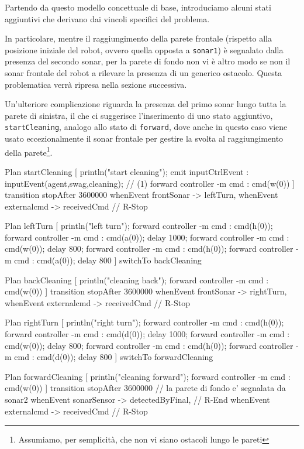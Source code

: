\documentclass{../llncs}
\newcommand{\code}[1]{{\color{blue}\small{\texttt{#1}}}}
\begin{document}
Partendo da questo modello concettuale di base, introduciamo alcuni stati aggiuntivi che derivano dai vincoli specifici del problema.

In particolare, mentre il raggiungimento della parete frontale (rispetto alla posizione iniziale del robot, ovvero quella opposta a \code{sonar1}) è segnalato dalla presenza del secondo sonar, per la parete di fondo non vi è altro modo se non il sonar frontale del robot a rilevare la presenza di un generico ostacolo. Questa problematica verrà ripresa nella sezione successiva.

Un'ulteriore complicazione riguarda la presenza del primo sonar lungo tutta la parete di sinistra, il che ci suggerisce l'inserimento di uno stato aggiuntivo, \texttt{startCleaning}, analogo allo stato di \texttt{forward}, dove anche in questo caso viene usato eccezionalmente il sonar frontale per gestire la svolta al raggiungimento della parete\footnote{Assumiamo, per semplicità, che non vi siano ostacoli lungo le pareti}.\\

\begin{qacode}[caption={SoftwareAgent, pt5}]
Plan startCleaning [
	println("start cleaning");
	emit inputCtrlEvent : inputEvent(agent,swag,cleaning); // (1)
	forward controller -m cmd : cmd(w(0))
]
transition stopAfter 3600000
	whenEvent frontSonar -> leftTurn,
	whenEvent externalcmd -> receivedCmd // R-Stop
	
Plan leftTurn [
	println("left turn");	
	forward controller -m cmd : cmd(h(0));
	forward controller -m cmd : cmd(a(0));
	delay 1000;
	forward controller -m cmd : cmd(w(0));
	delay 800;
	forward controller -m cmd : cmd(h(0));
	forward controller -m cmd : cmd(a(0));
	delay 800
]
switchTo backCleaning

Plan backCleaning [
	println("cleaning back");
	forward controller -m cmd : cmd(w(0))
]
transition stopAfter 3600000
	whenEvent frontSonar -> rightTurn,
	whenEvent externalcmd -> receivedCmd // R-Stop
	
Plan rightTurn [
	println("right turn");
	forward controller -m cmd : cmd(h(0));
	forward controller -m cmd : cmd(d(0));
	delay 1000;
	forward controller -m cmd : cmd(w(0));
	delay 800;
	forward controller -m cmd : cmd(h(0));
	forward controller -m cmd : cmd(d(0));
	delay 800
]
switchTo forwardCleaning

Plan forwardCleaning [
	println("cleaning forward");
	forward controller -m cmd : cmd(w(0))
]
transition stopAfter 3600000
	// la parete di fondo e' segnalata da sonar2
	whenEvent sonarSensor -> detectedByFinal, // R-End
	whenEvent externalcmd -> receivedCmd // R-Stop
\end{qacode}
\end{document}
